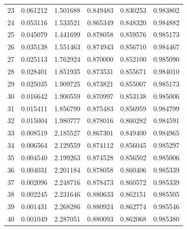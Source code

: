 \begin{table}[ht]
\begin{tabular}{c c c c c c}
23 & 0.061212 & 1.501688 & 0.849483 & 0.830253 & 0.983802 \\
24 & 0.053116 & 1.533521 & 0.865349 & 0.848320 & 0.984882 \\
25 & 0.045079 & 1.441699 & 0.878058 & 0.859576 & 0.985173 \\
26 & 0.035138 & 1.551463 & 0.874943 & 0.856710 & 0.984467 \\
27 & 0.025113 & 1.762924 & 0.870000 & 0.852100 & 0.985090 \\
28 & 0.028401 & 1.851935 & 0.873531 & 0.855671 & 0.984010 \\
29 & 0.025035 & 1.909725 & 0.873821 & 0.855007 & 0.985173 \\
30 & 0.016642 & 1.900559 & 0.870997 & 0.853138 & 0.985006 \\
31 & 0.015411 & 1.856799 & 0.875483 & 0.856959 & 0.984799 \\
32 & 0.015004 & 1.980777 & 0.878016 & 0.860282 & 0.984591 \\
33 & 0.008519 & 2.185527 & 0.867301 & 0.849400 & 0.984965 \\
34 & 0.006564 & 2.129559 & 0.874112 & 0.856045 & 0.985297 \\
35 & 0.004540 & 2.199263 & 0.874528 & 0.856502 & 0.985006 \\
36 & 0.004031 & 2.201184 & 0.878058 & 0.860406 & 0.985339 \\
37 & 0.002096 & 2.248716 & 0.878473 & 0.860572 & 0.985339 \\
38 & 0.002245 & 2.231646 & 0.880633 & 0.862151 & 0.985505 \\
39 & 0.001431 & 2.268286 & 0.880924 & 0.862774 & 0.985546 \\
40 & 0.001049 & 2.287051 & 0.880093 & 0.862068 & 0.985380 \\
\hline
\end{tabular}
\end{table}


